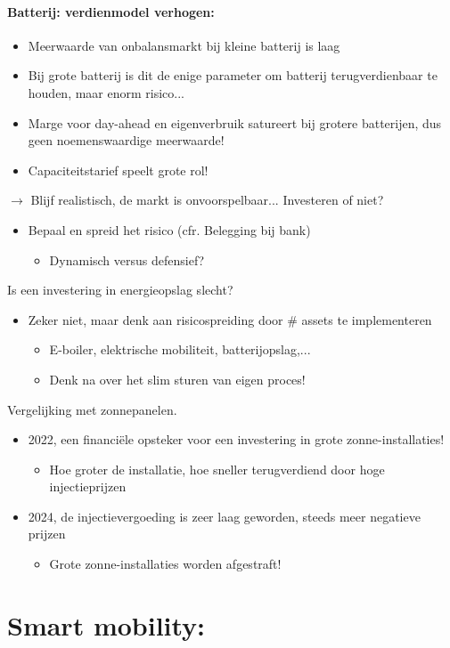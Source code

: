 \documentclass[12pt]{article}
\begin{document}
\paragraph{Batterij: verdienmodel verhogen:}
\begin{itemize}
    \item Meerwaarde van onbalansmarkt bij kleine
    batterij is laag
    \item Bij grote batterij is dit de enige parameter om
    batterij terugverdienbaar te houden, maar
    enorm risico...
    \item Marge voor day-ahead en eigenverbruik
    satureert bij grotere batterijen, dus geen
    noemenswaardige meerwaarde! 
    \item Capaciteitstarief speelt grote rol!
\end{itemize}
$\rightarrow$ Blijf realistisch, de markt is onvoorspelbaar...\bigbreak
Investeren of niet?\begin{itemize}
    \item Bepaal en spreid het risico (cfr. Belegging bij bank)\begin{itemize}
        \item Dynamisch versus defensief?
    \end{itemize}
\end{itemize}
Is een investering in energieopslag slecht?\begin{itemize}
    \item Zeker niet, maar denk aan risicospreiding door \# assets
    te implementeren\begin{itemize}
        \item E-boiler, elektrische mobiliteit, batterijopslag,... 
        \item Denk na over het slim sturen van eigen proces!
    \end{itemize}
\end{itemize}
Vergelijking met zonnepanelen.\begin{itemize}
    \item 2022, een financiële opsteker voor een investering in
    grote zonne-installaties!\begin{itemize}
        \item Hoe groter de installatie, hoe sneller
        terugverdiend door hoge injectieprijzen
    \end{itemize}
    \item 2024, de injectievergoeding is zeer laag geworden,
    steeds meer negatieve prijzen\begin{itemize}
        \item Grote zonne-installaties worden afgestraft!
    \end{itemize}
\end{itemize}
\section{Smart mobility:}
\end{document}

